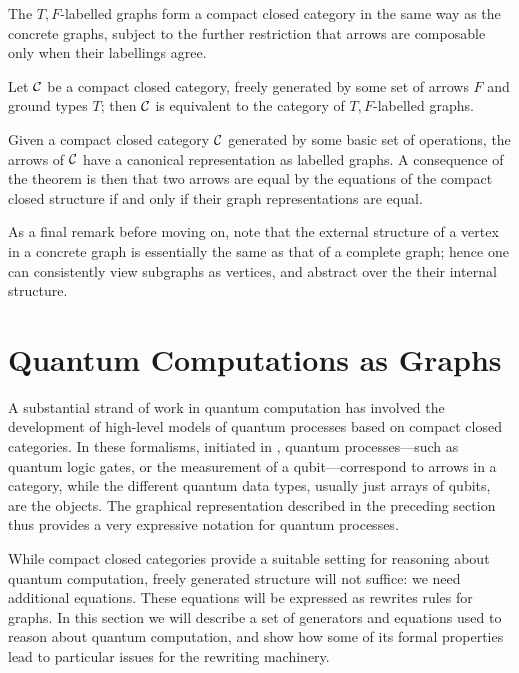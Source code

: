 \documentclass[runningheads]{llncs}
\newcommand{\catC}{\ensuremath{{\cal C}}\xspace}
\begin{document}
The $T,F$-labelled graphs form a compact closed category in the same
way as the concrete graphs, subject to the further restriction
that arrows are composable only when their labellings agree.  

\begin{theorem}
  Let \catC be a compact closed category, freely generated by some set
  of arrows $F$ and ground types $T$;  then \catC is equivalent to the
  category  of $T,F$-labelled graphs.
\end{theorem}

Given a compact closed  category  \catC generated by some basic set of
operations,  the arrows of \catC have a canonical representation as
labelled graphs.  A consequence of the theorem is then that two arrows
are equal by the equations of the compact closed  structure if and
only if their graph representations are equal.

As a final remark before moving on, note that the external structure
of a vertex in a concrete graph is essentially the same as that of a
complete graph; hence one can consistently view subgraphs as vertices,
and abstract over the their internal structure.

\section{Quantum Computations as Graphs}
\label{sec:quotients-rewriting}

A substantial strand of work in quantum computation has involved the
development of high-level models of quantum processes based on compact
closed categories.  In these formalisms, initiated in
\cite{AbrCoe:CatSemQuant:2004}, quantum processes---such as quantum
logic gates, or the measurement of a qubit---correspond to arrows in a
category, while the different quantum data types, usually just arrays
of qubits, are the objects.  The graphical representation described in
the preceding section thus provides a very expressive notation for quantum
processes.

While compact closed categories provide a suitable setting for
reasoning about quantum computation,
freely generated structure will not suffice:  we need additional
equations.  These equations will be expressed as rewrites rules for
graphs.  In this section we will describe a set of generators and equations
used to reason about quantum computation, and show how some of its formal
properties lead to particular issues for the rewriting machinery.
\end{document}
